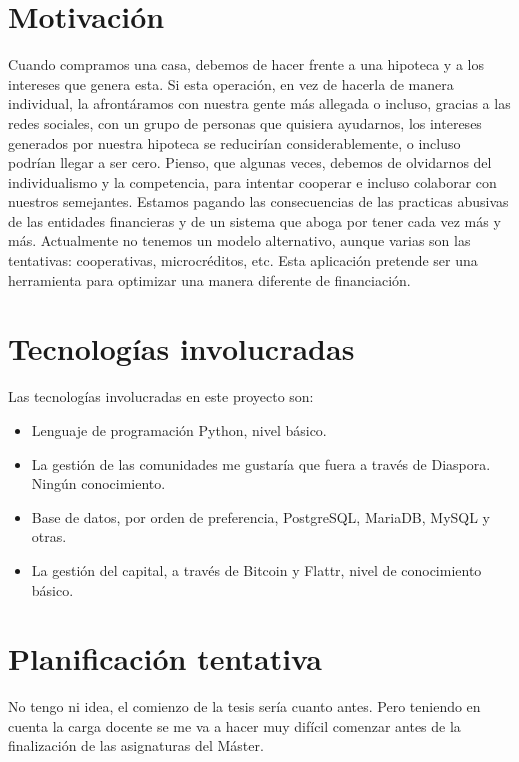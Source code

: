 \documentclass[10pt]{article}
\begin{document}
\section{Motivación}

Cuando compramos una casa, debemos de hacer frente a una hipoteca y a los intereses que genera esta. Si esta operación, en vez de hacerla de manera individual, la afrontáramos con nuestra gente más allegada o incluso, gracias a las redes sociales, con un grupo de personas que quisiera ayudarnos, los intereses generados por nuestra hipoteca se reducirían considerablemente, o incluso podrían llegar a ser cero. Pienso, que algunas veces, debemos de olvidarnos del individualismo y la competencia, para intentar cooperar e incluso colaborar con nuestros semejantes. Estamos pagando las consecuencias de las practicas abusivas de las entidades financieras y de un sistema que aboga por tener cada vez más y más. Actualmente no tenemos un modelo alternativo, aunque varias son las tentativas: cooperativas, microcréditos, etc. Esta aplicación pretende ser una herramienta para optimizar una manera diferente de financiación.

\section{Tecnologías involucradas}

Las tecnologías involucradas en este proyecto son:

\begin{itemize}
  \item Lenguaje de programación Python, nivel básico.
  \item La gestión de las comunidades me gustaría que fuera a través de Diaspora. Ningún conocimiento.
  \item Base de datos, por orden de preferencia, PostgreSQL, MariaDB, MySQL y otras.
  \item La gestión del capital, a través de Bitcoin y Flattr, nivel de conocimiento básico.
\end{itemize}

\section{Planificación tentativa}

No tengo ni idea, el comienzo de la tesis sería cuanto antes. Pero teniendo en cuenta la carga docente se me va a hacer muy difícil comenzar antes de la finalización de las asignaturas del Máster.
\end{document}
